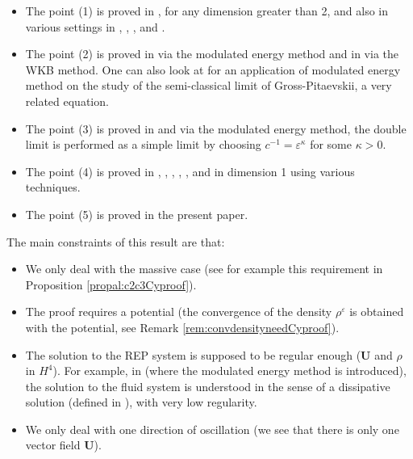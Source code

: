\documentclass[a4paper, 15pt]{article}
\numberwithin{equation}{section}
\begin{document}
\begin{itemize}
   \item[--]The point (1) is proved in \cite{zbMATH01837395}, \cite{zbMATH01747314} for any dimension greater than 2, and also in various settings in \cite{zbMATH03871951}, \cite{NAJMAN1990217} \cite{zbMATH06303453}, \cite{zbMATH01650142}
   \cite{pasquali2018dynamicsnonlinearkleingordonequation}, \cite{lei2023nonrelativistic} and \cite{bambusi2025nonrelativisticlimitnonlinear}. 
   \item [--]The point (2) is proved in \cite{zbMATH05243173} via the modulated energy method and in \cite{zbMATH01132286} via the WKB method. One can also look at \cite{zbMATH05000052} for an application of modulated energy method on the study of the semi-classical limit of Gross-Pitaevskii, a very related equation. 
   \item [--]The point (3) is proved in \cite{zbMATH06101438} and \cite{zbMATH06039446} via the modulated energy method, the double limit is performed as a simple limit by choosing $c^{-1}=\varepsilon^\kappa$ for some $\kappa>0$.
   \item [--]The point (4) is proved in \cite{zbMATH07119817}, \cite{zbMATH07531778}, \cite{MAI2022336}, \cite{zbMATH05077591}, \cite{zbMATH00840326}, \cite{zbMATH01309659} and \cite{zbMATH07114642} in dimension 1 using various techniques.
   \item [--]The point (5) is proved in the present paper.
\end{itemize}
The main constraints of this result are that:
\begin{itemize}
    \item We only deal with the massive case (see for example this requirement in Proposition \ref{propal:c2c3Cyproof}).
    \item The proof requires a potential (the convergence of the density $\rho^\varepsilon$ is obtained with the potential, see Remark \ref{rem:convdensityneedCyproof}). 
    \item The solution to the REP system is supposed to be regular enough ($\textbf{U}$ and $\rho$ in $H^4$). For example, in \cite{zbMATH01442880} (where the modulated energy method is introduced), the solution to the fluid system is understood in the sense of a dissipative solution (defined in \cite{zbMATH00928933}), with very low regularity. 
    \item We only deal with one direction of oscillation (we see that there is only one vector field $\textbf{U}$).\\
\end{itemize}
\end{document}
